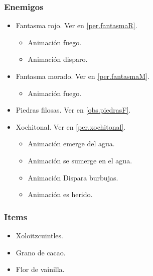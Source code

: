 \documentclass[11pt,letterpaper]{article}
\begin{document}
	\subsubsection{Enemigos}
	\begin{itemize}
		\item Fantasma rojo. Ver en \ref{per.fantasmaR}.
			\begin{itemize}
				\item Animación fuego.
				\item Animación disparo.
			\end{itemize}
		\item Fantasma morado. Ver en \ref{per.fantasmaM}.
			\begin{itemize}
				\item Animación fuego.
			\end{itemize}
		\item Piedras filosas. Ver en \ref{obs.piedrasF}.
		\item Xochitonal. Ver en \ref{per.xochitonal}.
			\begin{itemize}
				\item Animación emerge del agua.
				\item Animación se sumerge en el agua.
				\item Animación Dispara burbujas.  
				\item Animación es herido.
			\end{itemize}
	\end{itemize}
	\subsubsection{Items}
	\begin{itemize}
		\item Xoloitzcuintles.
		\item Grano de cacao.
		\item Flor de vainilla.
	\end{itemize}
\end{document}
